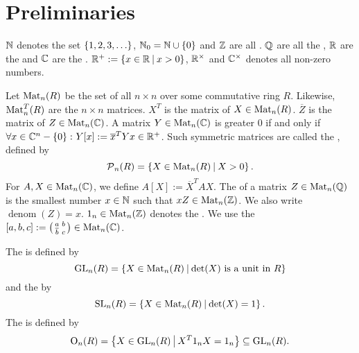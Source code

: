 

\section{Preliminaries}

$\mathbb{N}$ denotes the set $\Set{1,2,3,\dots}$, $\N_0 = \N \cup \Set{0}$ and $\mathbb{Z}$ are all . $\mathbb{Q}$ are all the , $\mathbb{R}$ are the  and $\mathbb{C}$ are the . $\R^+ := \Set{x\in\R}{x>0}$, $\mathbb{R}^\times$ and $\mathbb{C}^\times$ denotes all non-zero numbers.

Let $\operatorname{Mat}_n(R)$ be the set of all $n \times n$  over some commutative ring $R$.
Likewise, $\operatorname{Mat}_n^T(R)$ are the  $n \times n$ matrices.
$X^T$ is the  matrix of $X \in \operatorname{Mat}_n(R)$.
$\overline{Z}$ is the  matrix of $Z \in \operatorname{Mat}_n(\mathbb{C})$.
A matrix $Y \in \operatorname{Mat}_n(\mathbb{C})$ is greater $0$ if and only if $\forall x \in \C^n - \Set{0} \colon Y[x] := \overline{x}^{T} Y x \in \R^+$.
Such symmetric matrices are called the , defined by
\[ \PM_n(R) = \Set{X \in \M_n(R)}{X > 0}. \]
For $A,X \in \operatorname{Mat}_n(\mathbb{C})$, we define $A[X] := \overline{X}^T A X$. 
The  of a matrix $Z \in \operatorname{Mat}_n(\mathbb{Q})$ is the smallest number $x \in \mathbb{N}$ such that $x Z \in \operatorname{Mat}_n(\mathbb{Z})$. We also write $\operatorname{denom}(Z) = x$. $1_n \in \operatorname{Mat}_n(\mathbb{Z})$ denotes the . We use the  $[a,b,c] := \left( \begin{smallmatrix} a & b \\ \overline b & c \end{smallmatrix} \right) \in \operatorname{Mat}_n(\mathbb{C})$.

The  is defined by
\[ \GL_n(R) = \Set{X \in \M_n(R)}{\text{$\det(X)$ is a unit in $R$}} \]
and the  by
\[ \SL_n(R) = \Set{X \in \M_n(R)}{\det(X) = 1} . \] %
The  is defined by
\[ \Orth_n(R) = \Set{X \in \GL_n(R)}{X^T 1_n X = 1_n} \subseteq \GL_n(R) . \] %

